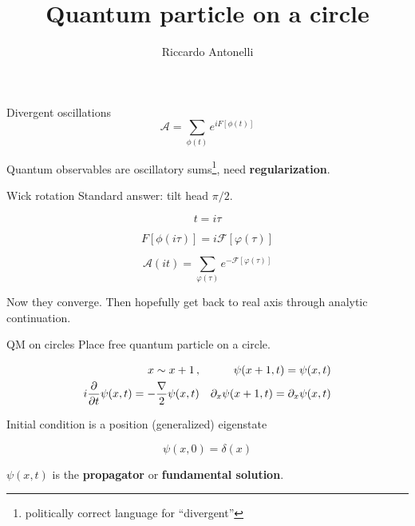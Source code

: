 \documentclass{beamer}
\title{Quantum particle on a circle}
\author{Riccardo Antonelli}
\begin{document}
\begin{frame}
    \maketitle
\end{frame}

\begin{frame}{Divergent oscillations}
\begin{equation*}
    \mathcal{A} = \sum_{\phi(t)} e^{iF[\phi(t)]}
    \label{}
\end{equation*}

Quantum observables are oscillatory sums\footnote{politically correct language for ``divergent''}, need \textbf{regularization}.

\end{frame}

\begin{frame}{Wick rotation}
    Standard answer: tilt head $\pi/2$.

    \begin{equation}
        t = i\tau
        \label{}
    \end{equation}

    \begin{equation}
        F[\phi(i\tau)] = i \mathcal{F}[\varphi(\tau)]
        \label{}
    \end{equation}

    \begin{equation}
        \mathcal{A}(it) = \sum_{\varphi(\tau)} e^{-\mathcal{F}[\varphi(\tau)]}
        \label{}
    \end{equation}

    Now they converge. Then hopefully get back to real axis through analytic continuation.
\end{frame}

\begin{frame}{QM on circles}
    Place free quantum particle on a circle.

    \begin{align}
        x \sim x + 1\,, && \psi(x+1,t) = \psi(x,t)\\
        i \pdv{t} \psi(x,t) = - {\nabla \over 2} \psi(x,t) && \partial_x \psi(x+1,t) = \partial_x \psi(x,t)
        \label{}
    \end{align}
    
    Initial condition is a position (generalized) eigenstate

    \begin{equation}
        \psi(x,0) = \delta(x)
        \label{}
    \end{equation}

    $\psi(x,t)$ is the \textbf{propagator} or \textbf{fundamental solution}.

\end{frame}
\end{document}
